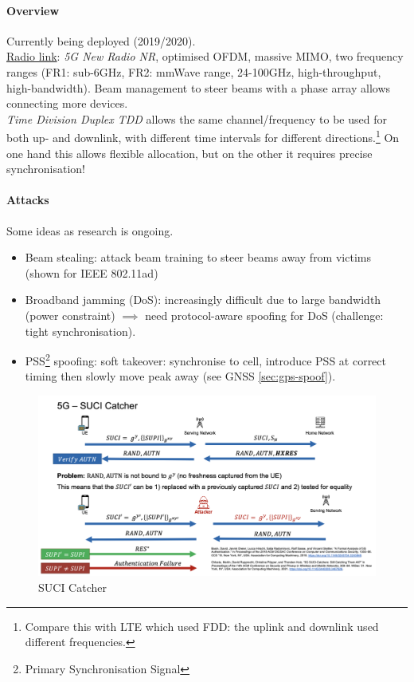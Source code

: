 \paragraph{Overview}
Currently being deployed (2019/2020). \\ \underline{Radio link}: \textit{5G New
	Radio NR}, optimised OFDM, massive MIMO, two frequency ranges (FR1: sub-6GHz,
FR2: mmWave range, 24-100GHz, high-throughput, high-bandwidth). Beam management
to steer beams with a phase array allows connecting more devices. \\
\textit{Time Division Duplex TDD} allows the same channel/frequency to be used
for both up- and downlink, with different time intervals for different
directions.\footnote{Compare this with LTE which used FDD: the uplink and
	downlink used different frequencies.} On one hand this allows flexible
allocation, but on the other it requires precise synchronisation!%

\paragraph{Attacks}
Some ideas as research is ongoing.
\begin{itemize}
	\item Beam stealing: attack beam training to steer beams away from victims (shown for
	      IEEE 802.11ad)
	\item Broadband jamming (DoS): increasingly difficult due to large bandwidth (power
	      constraint) $\implies$ need protocol-aware spoofing for DoS (challenge: tight
	      synchronisation).
	\item PSS\footnote{Primary Synchronisation Signal} spoofing: soft takeover:
	      synchronise to cell, introduce PSS at correct timing then slowly move peak away
	      (see GNSS \autoref{sec:gps-spoof}).
\end{itemize}
\begin{figure}[h]
	\centering
	\includegraphics[scale=0.3]{images/10-5g-suci.png}
	\caption{SUCI Catcher}%
	\label{fig:suci}
\end{figure}

